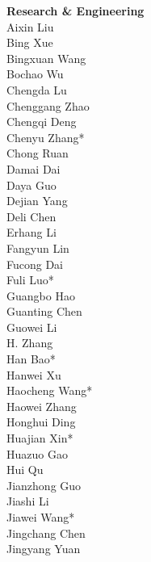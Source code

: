 \documentclass[11pt, a4paper, logo, copyright, nonumbering]{deepseek}
\begin{document}
\begin{CJK*}{UTF8}{gbsn}
\begin{multicols}{2} %
\noindent
\textbf{\color{damaiblue} Research \& Engineering} \\
\color{damaiblue} Aixin Liu \\
\color{damaiblue} Bing Xue \\
\color{damaiblue} Bingxuan Wang \\
\color{damaiblue} Bochao Wu \\
\color{damaiblue} Chengda Lu \\
\color{damaiblue} Chenggang Zhao \\
\color{damaiblue} Chengqi Deng \\
\color{damaiblue} Chenyu Zhang* \\
\color{damaiblue} Chong Ruan \\
\color{damaiblue} Damai Dai \\
\color{damaiblue} Daya Guo \\
\color{damaiblue} Dejian Yang \\
\color{damaiblue} Deli Chen \\
\color{damaiblue} Erhang Li \\
\color{damaiblue} Fangyun Lin \\
\color{damaiblue} Fucong Dai \\
\color{damaiblue} Fuli Luo* \\
\color{damaiblue} Guangbo Hao \\
\color{damaiblue} Guanting Chen \\
\color{damaiblue} Guowei Li \\
\color{damaiblue} H. Zhang \\
\color{damaiblue} Han Bao* \\
\color{damaiblue} Hanwei Xu \\
\color{damaiblue} Haocheng Wang* \\
\color{damaiblue} Haowei Zhang \\
\color{damaiblue} Honghui Ding \\
\color{damaiblue} Huajian Xin* \\
\color{damaiblue} Huazuo Gao \\
\color{damaiblue} Hui Qu \\
\color{damaiblue} Jianzhong Guo \\
\color{damaiblue} Jiashi Li \\
\color{damaiblue} Jiawei Wang* \\
\color{damaiblue} Jingchang Chen \\
\color{damaiblue} Jingyang Yuan \\

\end{multicols}
\end{CJK*}
\end{document}
